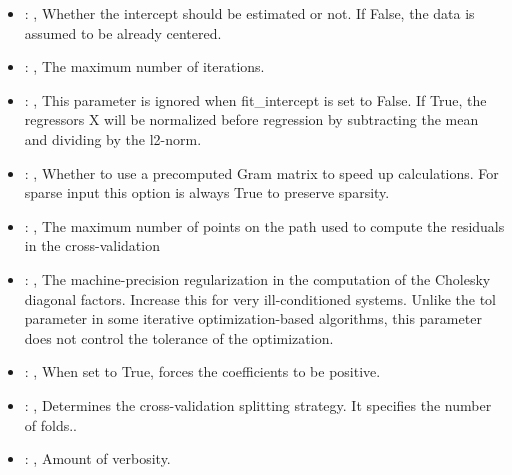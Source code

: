 \begin{itemize}
    \item {}: , 
      Whether the intercept should be estimated or not. If False,
      the data is assumed to be already centered.

    \item {}: , 
      The maximum number of iterations.

    \item {}: , 
      This parameter is ignored when fit\_intercept is set to False. If True,
      the regressors X will be normalized before regression by subtracting the mean and
      dividing by the l2-norm.

    \item {}: , 
      Whether to use a precomputed Gram matrix to speed up calculations.
      For sparse input this option is always True to preserve sparsity.

    \item {}: , 
      The maximum number of points on the path used to compute the residuals in
      the cross-validation

    \item {}: , 
      The machine-precision regularization in the computation of the Cholesky
      diagonal factors. Increase this for very ill-conditioned systems. Unlike the tol
      parameter in some iterative optimization-based algorithms, this parameter does not
      control the tolerance of the optimization.

    \item {}: , 
      When set to True, forces the coefficients to be positive.

    \item {}: , 
      Determines the cross-validation splitting strategy.
      It specifies the number of folds..

    \item {}: , 
      Amount of verbosity.
  \end{itemize}
